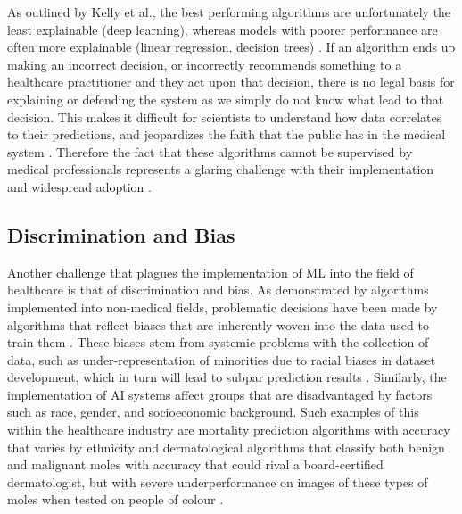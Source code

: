 \documentclass[12pt]{article}
\begin{document}
As outlined by Kelly et al., the best performing algorithms are unfortunately the least explainable (deep learning), whereas models with poorer performance are often more explainable (linear regression, decision trees) \citep{Kelly_2019}. If an algorithm ends up making an incorrect decision, or incorrectly recommends something to a healthcare practitioner and they act upon that decision, there is no legal basis for explaining or defending the system as we simply do not know what lead to that decision. This makes it difficult for scientists to understand how data correlates to their predictions, and jeopardizes the faith that the public has in the medical system \citep{Khan_2023}. Therefore the fact that these algorithms cannot be supervised by medical professionals represents a glaring challenge with their implementation and widespread adoption \citep{Murdoch_2021}.

\vspace{-5mm}
\subsection{Discrimination and Bias}

Another challenge that plagues the implementation of ML into the field of healthcare is that of discrimination and bias. As demonstrated by algorithms implemented into non-medical fields, problematic decisions have been
made by algorithms that reflect biases that are inherently woven into the data used to train them \citep{Char_2018,Khan_2023,Kelly_2019}. These biases stem from systemic problems with the collection of data, such as under-representation of minorities due to racial biases in dataset development, which in turn will lead to subpar prediction results \citep{Khan_2023}. Similarly, 
the implementation of AI systems affect groups that are disadvantaged by factors such as race, gender, and socioeconomic background. Such examples of this within the healthcare industry are mortality prediction algorithms
with accuracy that varies by ethnicity \citep{Chen_2018} and dermatological algorithms that classify both benign and malignant moles with accuracy that could rival a board-certified dermatologist, but with severe underperformance on images of these types of moles when tested on people of colour \citep{Esteva_2017,Haenssle_2019}. \ 

\newpage
\end{document}
